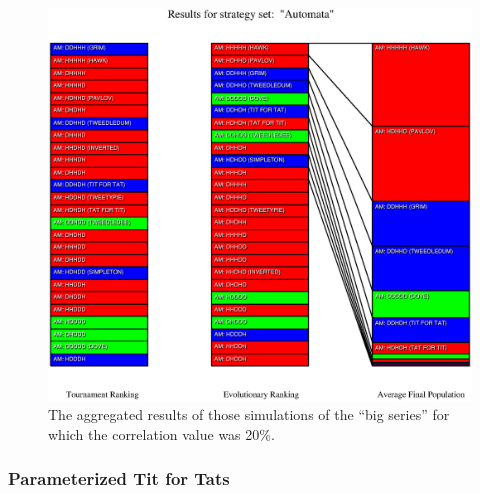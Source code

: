 \begin{figure}
\begin{center}
\includegraphics[width=20cm]{tables/Automata_C0.200.eps}
\caption{\label{Automata_C0200} The aggregated results of those
simulations of the ``big series'' for which the correlation value was 20\%.}
\end{center}
\end{figure}

\newpage
\subsubsection{Parameterized Tit for Tats}


